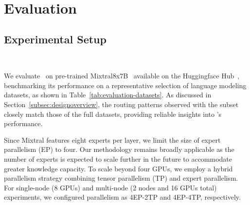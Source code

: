 \section{Evaluation}
\subsection{Experimental Setup}~\label{subsec:setup}
\vspace{-2ex}

 We evaluate \expertune~on pre-trained Mixtral8x7B~\cite{mixtral} available on the Huggingface Hub~\cite{huggingface}, benchmarking its performance on a representative selection of language modeling datasets, as shown in Table~\ref{tab:evaluation-datasets}. 
%
As discussed in Section~\ref{subsec:designoverview}, the routing patterns observed with the subset closely match those of the full datasets, providing reliable insights into \expertune's performance. 

\begin{table}
    \centering
    \caption{Evaluation Datasets}
    \vspace{-0.7em}
    \label{tab:evaluation-datasets}
\end{table}

%
Since Mixtral features eight experts per layer, we limit the size of expert parallelism (EP) to four. 
%
Our methodology remains broadly applicable as the number of experts is expected to scale further in the future to accommodate greater knowledge capacity. To scale beyond four GPUs, we employ a hybrid parallelism strategy combining tensor parallelism (TP) and expert parallelism.
%
For single-node (8 GPUs) and multi-node (2 nodes and 16 GPUs total) experiments, we configured parallelism as 4EP-2TP and 4EP-4TP, respectively.

